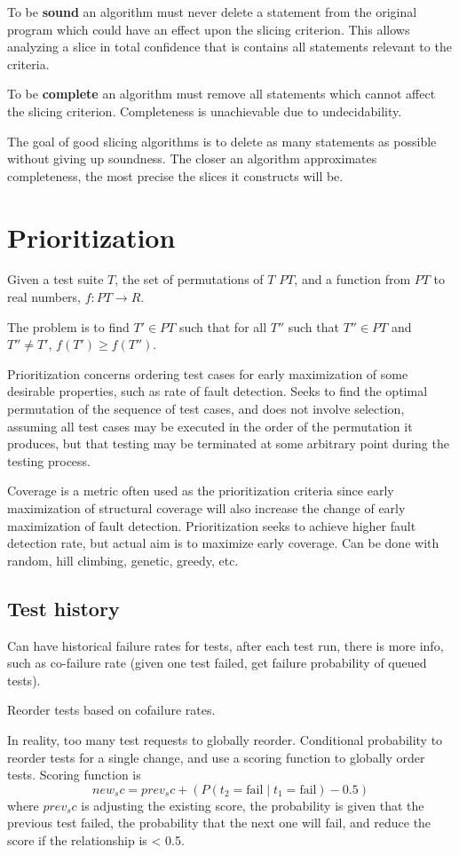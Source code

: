 \documentclass[11pt]{article}
\begin{document}
To be \textbf{sound} an algorithm must never delete a statement from the original
program which could have an effect upon the slicing criterion. This allows
analyzing a slice in total confidence that is contains all statements relevant
to the criteria.

To be \textbf{complete} an algorithm must remove all statements which cannot affect the
slicing criterion. Completeness is unachievable due to undecidability.

The goal of good slicing algorithms is to delete as many statements as possible
without giving up soundness. The closer an algorithm approximates completeness,
the most precise the slices it constructs will be.
\section{Prioritization}
\label{sec:orgd93780f}
Given a test suite \(T\), the set of permutations of \(T\) \(PT\), and a function from \(PT\)
to real numbers, \(f: PT \to R\).

The problem is to find \(T' \in PT\) such that for all \(T''\) such that \(T'' \in PT\) and
\(T'' \ne T'\), \(f(T') \ge f(T'')\).

Prioritization concerns ordering test cases for early maximization of some desirable
properties, such as rate of fault detection.
Seeks to find the optimal permutation of the sequence of test cases, and does not
involve selection, assuming all test cases may be executed in the order of the
permutation it produces, but that testing may be terminated at some arbitrary point
during the testing process.

Coverage is a metric often used as the prioritization criteria since early maximization of structural
coverage will also increase the change of early maximization of fault detection.
Prioritization seeks to achieve higher fault detection rate, but actual aim is to maximize early
coverage.
Can be done with random, hill climbing, genetic, greedy, etc.
\subsection{Test history}
\label{sec:org09e8661}
Can have historical failure rates for tests, after each test run, there is more info, such as
co-failure rate (given one test failed, get failure probability of queued tests).

Reorder tests based on cofailure rates.

In reality, too many test requests to globally reorder.
Conditional probability to reorder tests for a single change, and use a scoring function
to globally order tests.
Scoring function is
$$
new_sc = prev_sc + (P(t_{2} = \text{fail} \mid t_{1} = \text{fail}) - 0.5)
$$
where \(prev_sc\) is adjusting the existing score, the probability is given that the previous test failed,
the probability that the next one will fail, and reduce the score if the relationship is < 0.5.
\end{document}
